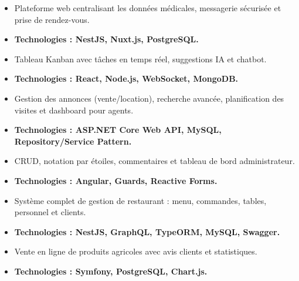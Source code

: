 \documentclass[10pt,a4paper]{altacv}
\begin{document}
\begin{itemize}
  \item Plateforme web centralisant les données médicales, messagerie sécurisée et prise de rendez-vous.
  \item \textbf{Technologies : NestJS, Nuxt.js, PostgreSQL.}
\end{itemize}

\begin{itemize}
  \item Tableau Kanban avec tâches en temps réel, suggestions IA et chatbot.
  \item \textbf{Technologies : React, Node.js, WebSocket, MongoDB.}
\end{itemize}

\begin{itemize}
  \item Gestion des annonces (vente/location), recherche avancée, planification des visites et dashboard pour agents.
  \item \textbf{Technologies : ASP.NET Core Web API, MySQL, Repository/Service Pattern.}
\end{itemize}

\begin{itemize}
  \item CRUD, notation par étoiles, commentaires et tableau de bord administrateur.
  \item \textbf{Technologies : Angular, Guards, Reactive Forms.}
\end{itemize}

\begin{itemize}
  \item Système complet de gestion de restaurant : menu, commandes, tables, personnel et clients.
  \item \textbf{Technologies : NestJS, GraphQL, TypeORM, MySQL, Swagger.}
\end{itemize}

\begin{itemize}
  \item Vente en ligne de produits agricoles avec avis clients et statistiques.
  \item \textbf{Technologies : Symfony, PostgreSQL, Chart.js.}
\end{itemize}
\end{document}
